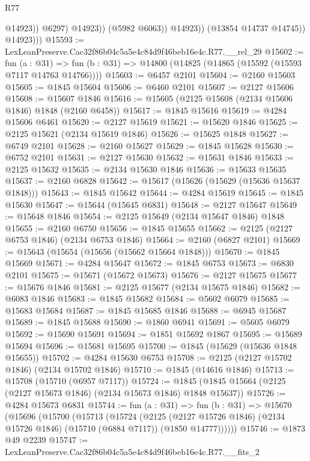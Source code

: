 \begin{lexlean}{R77}
\begin{coremodule}
                            @14923))
                        @6297)
                      @14923))
                  (@5982 @6063))
                @14923))
            (@13854 @14737 @14745))
          @14923)))
@15593 := LexLeanPreserve.Cac32f86b04c5a5e4c84d9f46beb16e4c.R77.__rel_29
@15602 := fun (a : @31) =>
  fun (b : @31) => @14800 (@14825 (@14865 (@15592 (@15593 @7117 @14763 @14766))))
@15603 := @6457 @2101
@15604 := @2160 @15603
@15605 := @1845 @15604
@15606 := @6460 @2101
@15607 := @2127 @15606
@15608 := @15607 @1846
@15616 := @15605 (@2125 @15608 (@2134 @15606 @1846) @1848 (@2160 @6458))
@15617 := @1845 @15616
@15619 := @4284 @15606 @6461
@15620 := @2127 @15619
@15621 := @15620 @1846
@15625 := @2125 @15621 (@2134 @15619 @1846)
@15626 := @15625 @1848
@15627 := @6749 @2101
@15628 := @2160 @15627
@15629 := @1845 @15628
@15630 := @6752 @2101
@15631 := @2127 @15630
@15632 := @15631 @1846
@15633 := @2125 @15632
@15635 := @2134 @15630 @1846
@15636 := @15633 @15635
@15637 := @2160 @6828
@15642 := @15617 (@15626 (@15629 (@15636 @15637 @1848)))
@15643 := @1845 @15642
@15644 := @4284 @15619
@15645 := @1845 @15630
@15647 := @15644 (@15645 @6831)
@15648 := @2127 @15647
@15649 := @15648 @1846
@15654 := @2125 @15649 (@2134 @15647 @1846) @1848
@15655 := @2160 @6750
@15656 := @1845 @15655
@15662 := @2125 (@2127 @6753 @1846) (@2134 @6753 @1846)
@15664 := @2160 (@6827 @2101)
@15669 := @15643 (@15654 (@15656 (@15662 @15664 @1848)))
@15670 := @1845 @15669
@15671 := @4284 @15647
@15672 := @1845 @6753
@15673 := @6830 @2101
@15675 := @15671 (@15672 @15673)
@15676 := @2127 @15675
@15677 := @15676 @1846
@15681 := @2125 @15677 (@2134 @15675 @1846)
@15682 := @6083 @1846
@15683 := @1845 @15682
@15684 := @5602 @6079
@15685 := @15683 @15684
@15687 := @1845 @15685 @1846
@15688 := @6945 @15687
@15689 := @1845 @15688
@15690 := @1860 @6941
@15691 := @5605 @6079
@15692 := @15690 @15691
@15694 := @1851 @15692 @1867
@15695 := @15689 @15694
@15696 := @15681 @15695
@15700 := @1845 (@15629 (@15636 @1848 @15655))
@15702 := @4284 @15630 @6753
@15708 := @2125 (@2127 @15702 @1846) (@2134 @15702 @1846)
@15710 := @1845 (@14616 @1846)
@15713 := @15708 (@15710 (@6957 @7117))
@15724 := @1845 (@1845 @15664 (@2125 (@2127 @15673 @1846) (@2134 @15673 @1846) @1848 @15637))
@15726 := @4284 @15673 @6831
@15744 := fun (a : @31) =>
  fun (b : @31) =>
  @15670
    (@15696
      (@15700
        (@15713
          (@15724
            (@2125
              (@2127 @15726 @1846)
              (@2134 @15726 @1846)
              (@15710 (@6884 @7117))
              (@1850 @14777))))))
@15746 := @1873 @49 @2239
@15747 := LexLeanPreserve.Cac32f86b04c5a5e4c84d9f46beb16e4c.R77.__fits_2

\end{coremodule}
\end{lexlean}
